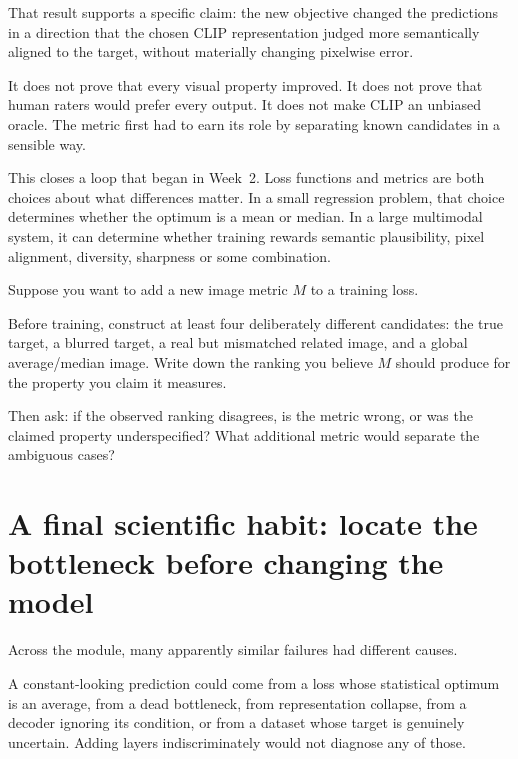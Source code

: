 That result supports a specific claim: the new objective changed the predictions in a direction that the chosen CLIP representation judged more semantically aligned to the target, without materially changing pixelwise error.

It does not prove that every visual property improved. It does not prove that human raters would prefer every output. It does not make CLIP an unbiased oracle. The metric first had to earn its role by separating known candidates in a sensible way.

This closes a loop that began in Week~2. Loss functions and metrics are both choices about what differences matter. In a small regression problem, that choice determines whether the optimum is a mean or median. In a large multimodal system, it can determine whether training rewards semantic plausibility, pixel alignment, diversity, sharpness or some combination.

\begin{optionalexercise}[title={Optional design exercise --- validate before optimising}]
Suppose you want to add a new image metric \(M\) to a training loss.

Before training, construct at least four deliberately different candidates: the true target, a blurred target, a real but mismatched related image, and a global average/median image. Write down the ranking you believe \(M\) should produce for the property you claim it measures.

Then ask: if the observed ranking disagrees, is the metric wrong, or was the claimed property underspecified? What additional metric would separate the ambiguous cases?
\end{optionalexercise}

\section{A final scientific habit: locate the bottleneck before changing the model}

Across the module, many apparently similar failures had different causes.

A constant-looking prediction could come from a loss whose statistical optimum is an average, from a dead bottleneck, from representation collapse, from a decoder ignoring its condition, or from a dataset whose target is genuinely uncertain. Adding layers indiscriminately would not diagnose any of those.

